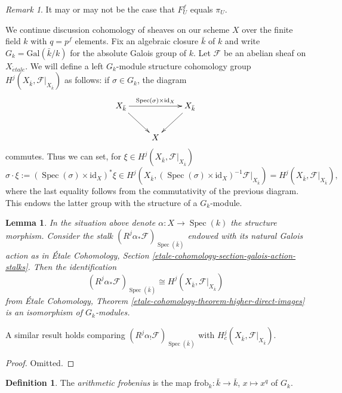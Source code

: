 \documentclass{stacks-project}
\theoremstyle{plain}
\newtheorem{lemma}[subsection]{Lemma}
\theoremstyle{definition}
\newtheorem{definition}[subsection]{Definition}
\theoremstyle{remark}
\newtheorem{remark}[subsection]{Remark}
\numberwithin{equation}{subsection}
\def\Spec{\mathop{\mathrm{Spec}}}
\def\etale{{\acute{e}tale}}
\begin{document}
\begin{remark}
\label{remark-may-be-confusing}
It may or may not be the case that $F^f_U$ equals $\pi_U$.
\end{remark}

\noindent
We continue discussion cohomology of sheaves on our scheme $X$ over
the finite field $k$ with $q = p^f$ elements.
Fix an algebraic closure $\bar k$ of $k$ and write $G_k =
\text{Gal}(\bar k/k)$ for the absolute Galois group of $k$.
Let $\mathcal{F}$ be an abelian sheaf on $X_\etale$.
We will define a left $G_k$-module structure
cohomology group $H^j (X_{\bar k}, \mathcal{F}|_{X_{\bar k}})$
as follows: if $\sigma \in G_k$, the diagram
$$
\xymatrix{
X_{\bar k} \ar[rd] \ar[rr]^{\Spec(\sigma) \times \text{id}_X} & &
X_{\bar k} \ar[ld] \\
& X
}
$$
commutes. Thus we can set, for $\xi \in H^j (X_{\bar k}, \mathcal{F}|_{X_{\bar
k}})$
$$
\sigma \cdot \xi := (\Spec(\sigma) \times \text{id}_X)^*\xi \in
H^j(X_{\bar k}, (\Spec(\sigma) \times \text{id}_X)^{-1}
\mathcal{F}|_{X_{\bar k}})
= H^j (X_{\bar k}, \mathcal{F}|_{X_{\bar k}}),
$$
where the last equality follows from the commutativity of the previous diagram.
This endows the latter group with the structure of a $G_k$-module.

\begin{lemma}
\label{lemma-two-actions-agree}
In the situation above denote $\alpha : X \to \Spec(k)$ the structure morphism.
Consider the stalk $(R^j\alpha_*\mathcal{F})_{\Spec(\bar k)}$ endowed with its
natural Galois action as in
\'Etale Cohomology, Section \ref{etale-cohomology-section-galois-action-stalks}.
Then the identification
$$
(R^j\alpha_*\mathcal{F})_{\Spec(\bar k)} \cong H^j (X_{\bar k},
\mathcal{F}|_{X_{\bar k}})
$$
from
\'Etale Cohomology, Theorem \ref{etale-cohomology-theorem-higher-direct-images}
is an isomorphism of $G_k$-modules.
\end{lemma}

\noindent
A similar result holds comparing
$(R^j\alpha_!\mathcal{F})_{\Spec(\bar k)}$ with
$H^j_c (X_{\bar k}, \mathcal{F}|_{X_{\bar k}})$.

\begin{proof}
Omitted.
\end{proof}

\begin{definition}
\label{definition-arithmetic-frobenius}
The {\it arithmetic frobenius} is the map
$\text{frob}_k : \bar k \to \bar k$, $x \mapsto x^q$ of $G_k$.
\end{definition}
\end{document}
